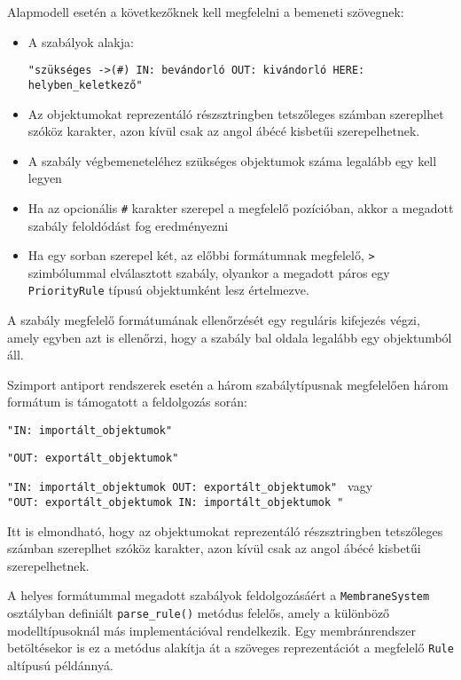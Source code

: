 Alapmodell esetén a következőknek kell megfelelni a bemeneti szövegnek:
\begin{itemize}
\item  A szabályok alakja: \\
\begin{small}
\verb|"szükséges ->(#) IN: bevándorló OUT: kivándorló HERE: helyben_keletkező"|
\end{small} 
\item Az objektumokat reprezentáló részsztringben tetszőleges számban szereplhet szóköz karakter, azon kívül csak az angol ábécé kisbetűi szerepelhetnek.
\item A szabály végbemeneteléhez szükséges objektumok száma legalább egy kell legyen
\item Ha az opcionális \verb|#| karakter szerepel a megfelelő pozícióban, akkor a megadott szabály feloldódást fog eredményezni
\item Ha egy sorban szerepel két, az előbbi formátumnak megfelelő, \verb|>| szimbólummal elválasztott szabály, olyankor a megadott páros egy \verb|PriorityRule| típusú objektumként lesz értelmezve. 
\end{itemize}

A szabály megfelelő formátumának ellenőrzését egy reguláris kifejezés végzi, amely egyben azt is ellenőrzi, hogy a szabály bal oldala legalább egy objektumból áll.

Szimport antiport rendszerek esetén a három szabálytípusnak megfelelően három formátum is támogatott a feldolgozás során:
\begin{compactenum}
\item \verb|"IN: importált_objektumok"|
\item \verb|"OUT: exportált_objektumok"|
\item 
\begin{small}
\verb|"IN: importált_objektumok OUT: exportált_objektumok" | vagy \\ \verb|"OUT: exportált_objektumok IN: importált_objektumok "|
\end{small}
\end{compactenum}

Itt is elmondható, hogy az objektumokat reprezentáló részsztringben tetszőleges számban szereplhet szóköz karakter, azon kívül csak az angol ábécé kisbetűi szerepelhetnek.

A helyes formátummal megadott szabályok feldolgozásáért a \verb|MembraneSystem| osztályban definiált \verb|parse_rule()| metódus felelős, amely a különböző modelltípusoknál más implementációval rendelkezik. Egy membránrendszer betöltésekor is ez a metódus alakítja át a szöveges reprezentációt a megfelelő \verb|Rule| altípusú példánnyá.

